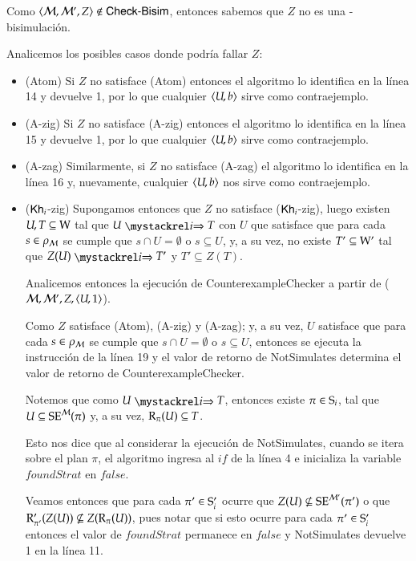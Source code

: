 \begin{demostracion}
\begin{itemize}
        Como $\tup{\modults,\modults',Z} \not \in \CBisim$, entonces sabemos que $Z$ no es una \KHilogic-bisimulación.

        Analicemos los posibles casos donde podría fallar $Z$:

        \begin{itemize}
            \item (Atom) Si $Z$ no satisface (Atom) entonces el algoritmo lo identifica en la línea 14 y devuelve 1, por lo que
            cualquier $\tup{U,b}$ sirve como contraejemplo.
            \item (A-zig) Si $Z$ no satisface (A-zig) entonces el algoritmo lo identifica en la línea 15 y devuelve 1, 
            por lo que cualquier $\tup{U,b}$ sirve como contraejemplo.
            \item (A-zag) Similarmente, si $Z$ no satisface (A-zag) el algoritmo lo identifica en la línea 16 y,  
            nuevamente, cualquier $\tup{U,b}$ nos sirve como contraejemplo.
            \item ($\khi$-zig) Supongamos entonces que $Z$ no satisface ($\khi$-zig), luego existen $U, T \subseteq \W$ tal que
            $U \ultsExecAgi T$ con $U$ que satisface que para cada $s \in \rho_\model$ se cumple que $s \cap U = \emptyset$ o $s \subseteq U$, 
            y, a su vez, no existe $T' \subseteq \W'$ tal que $Z(U) \ultsExecAgi T'$ y $T' \subseteq Z(T)$.

            Analicemos entonces la ejecución de \textsf{CounterexampleChecker} a partir de ($\modults,\modults',Z,\tup{U,1}$).

            Como $Z$ satisface (Atom), (A-zig) y (A-zag); y, a su vez, $U$ satisface que para cada $s \in \rho_\model$ se cumple 
            que $s \cap U = \emptyset$ o $s \subseteq U$, entonces se ejecuta la instrucción de la línea 19 y el valor de retorno de 
            \textsf{NotSimulates} determina el valor de retorno de \textsf{CounterexampleChecker}.

            Notemos que como $U \ultsExecAgi T$, entonces existe $\pi \in \S_i$, tal que $U \subseteq \sexec^{\model}(\pi)$ y, 
            a su vez, $\R_\pi(U) \subseteq T$. 
            
            Esto nos dice que al considerar la ejecución de \textsf{NotSimulates}, cuando se itera sobre el plan $\pi$, el algoritmo 
            ingresa al $if$ de la línea 4 e inicializa la variable $foundStrat$ en $false$.

            Veamos entonces que para cada $\pi' \in \S_i'$ ocurre que $Z(U) \not \subseteq \sexec^{\model'}(\pi')$ o que 
            $\R'_{\pi'}(Z(U)) \not \subseteq Z(\R_\pi(U))$, pues notar que si esto ocurre para cada $\pi'\in\S'_i$ entonces 
            el valor de $foundStrat$ permanece en $false$ y \textsf{NotSimulates} devuelve 1 en la línea 11.


\end{itemize}
\end{itemize}
\end{demostracion}
